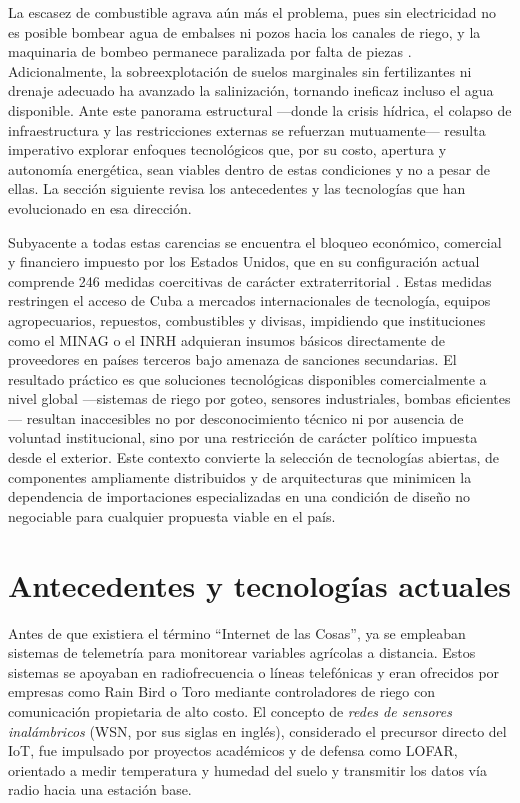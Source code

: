La escasez de combustible agrava aún más el problema, pues sin electricidad no es posible bombear agua de embalses ni pozos hacia los canales de riego, y la maquinaria de bombeo permanece paralizada por falta de piezas \citep{alnap2024}. Adicionalmente, la sobreexplotación de suelos marginales sin fertilizantes ni drenaje adecuado ha avanzado la salinización, tornando ineficaz incluso el agua disponible. Ante este panorama estructural ---donde la crisis hídrica, el colapso de infraestructura y las restricciones externas se refuerzan mutuamente--- resulta imperativo explorar enfoques tecnológicos que, por su costo, apertura y autonomía energética, sean viables dentro de estas condiciones y no a pesar de ellas. La sección siguiente revisa los antecedentes y las tecnologías que han evolucionado en esa dirección.

Subyacente a todas estas carencias se encuentra el bloqueo económico, comercial y financiero impuesto por los Estados Unidos, que en su configuración actual comprende 246 medidas coercitivas de carácter extraterritorial \citep{cubabloqueo2024}. Estas medidas restringen el acceso de Cuba a mercados internacionales de tecnología, equipos agropecuarios, repuestos, combustibles y divisas, impidiendo que instituciones como el MINAG o el INRH adquieran insumos básicos directamente de proveedores en países terceros bajo amenaza de sanciones secundarias. El resultado práctico es que soluciones tecnológicas disponibles comercialmente a nivel global ---sistemas de riego por goteo, sensores industriales, bombas eficientes--- resultan inaccesibles no por 
desconocimiento técnico ni por ausencia de voluntad institucional, sino por una restricción de carácter político impuesta desde el exterior. Este contexto convierte la selección de tecnologías abiertas, de componentes ampliamente distribuidos y de arquitecturas que minimicen la dependencia de importaciones especializadas en una condición de diseño no negociable para cualquier propuesta viable en el país.

\section{Antecedentes y tecnologías actuales}\label{sec:antecedentes}

Antes de que existiera el término ``Internet de las Cosas'', ya se empleaban sistemas de telemetría para monitorear variables agrícolas a distancia. Estos sistemas se apoyaban en radiofrecuencia o líneas telefónicas y eran ofrecidos por empresas como Rain Bird o Toro mediante controladores de riego con comunicación propietaria de alto costo. El concepto de \emph{redes de sensores inalámbricos} (WSN, por sus siglas en inglés), considerado el precursor directo del IoT, fue impulsado por proyectos académicos y de defensa como LOFAR, orientado a medir temperatura y humedad del suelo y transmitir los datos vía radio hacia una estación base.

